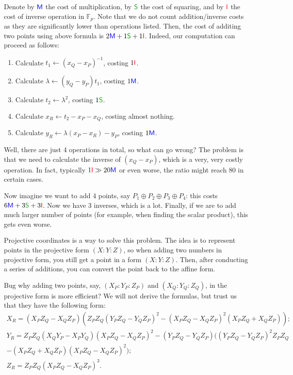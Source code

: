 \documentclass[../lecture-notes.tex]{subfiles}
\begin{document}
Denote by $\textcolor{blue}{\mathsf{M}}$ the cost of multiplication, by $\textcolor{green!60!black}{\mathsf{S}}$ the cost of squaring, and by $\textcolor{red}{\mathsf{I}}$ the cost of inverse operation in $\mathbb{F}_p$. Note that we do not count addition/inverse costs as they are significantly lower than operations listed. Then, the cost of additing two points using above formula is $2\textcolor{blue}{\mathsf{M}} + 1\textcolor{green!60!black}{\mathsf{S}} + 1\textcolor{red}{\mathsf{I}}$. Indeed, our computation can proceed as follows:
\begin{enumerate}
    \item Calculate $t_1 \gets (x_Q-x_P)^{-1}$, costing $1\textcolor{red}{\mathsf{I}}$.
    \item Calculate $\lambda \gets (y_Q-y_P)t_1$, costing $1\textcolor{blue}{\mathsf{M}}$.
    \item Calculate $t_2 \gets \lambda^2$, costing $1\textcolor{green!60!black}{\mathsf{S}}$.
    \item Calculate $x_R \gets t_2 - x_P - x_Q$, costing almost nothing.
    \item Calculate $y_R \gets \lambda (x_P-x_R) - y_P$, costing $1\textcolor{blue}{\mathsf{M}}$.
\end{enumerate}

Well, there are just 4 operations in total, so what can go wrong? The problem is that we need to calculate the inverse of $(x_Q-x_P)$, which is a very, very costly operation. In fact, typically $1\textcolor{red}{\mathsf{I}} \gg 20\textcolor{blue}{\mathsf{M}}$ or even worse, the ratio might reach $80$ in certain cases.

Now imagine we want to add 4 points, say $P_1 \oplus P_2 \oplus P_3 \oplus P_4$: this costs $6\textcolor{blue}{\mathsf{M}} + 3\textcolor{green!60!black}{\mathsf{S}} + 3\textcolor{red}{\mathsf{I}}$. Now we have 3 inverses, which is a lot. Finally, if we are to add much larger number of points (for example, when finding the scalar product), this gets even worse. 

Projective coordinates is a way to solve this problem. The idea is to represent points in the projective form $(X:Y:Z)$, so when adding two numbers in projective form, you still get a point in a form $(X:Y:Z)$. Then, after conducting a series of additions, you can convert the point back to the affine form. 

Bug why adding two points, say, $(X_P:Y_P:Z_P)$ and $(X_Q:Y_Q:Z_Q)$, in the projective form is more efficient? We will not derive the formulas, but trust us that they have the following form:
\begin{equation}
    \begin{aligned}
        X_R = (X_PZ_Q - X_QZ_P)(Z_PZ_Q(Y_PZ_Q-Y_QZ_P)^2 - (X_PZ_Q-X_QZ_P)^2(X_PZ_Q+X_QZ_P)); \\
        Y_R = Z_PZ_Q(X_QY_P - X_PY_Q)(X_PZ_Q-X_QZ_P)^2 - (Y_PZ_Q-Y_QZ_P)((Y_PZ_Q-Y_QZ_P)^2Z_PZ_Q\\-(X_PZ_Q+X_QZ_P)(X_PZ_Q-X_QZ_P)^2); \\
        Z_R = Z_PZ_Q(X_PZ_Q - X_QZ_P)^3.
    \end{aligned}
\end{equation}
\end{document}
